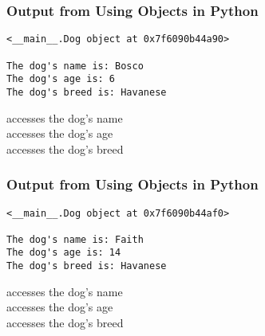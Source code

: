 \documentclass[14pt,aspectratio=169]{beamer}
\begin{document}
%
\begin{frame}[fragile]
  \frametitle{Output from Using Objects in Python}
  \begin{minipage}{6in}
    \vspace*{.15in}
    \begin{verbatim}
<__main__.Dog object at 0x7f6090b44a90>

The dog's name is: Bosco
The dog's age is: 6
The dog's breed is: Havanese
    \end{verbatim}
  \end{minipage}
  \vspace*{.05in}
  \begin{center}
    \normalsize {} accesses the dog's name \\
    \normalsize {} accesses the dog's age \\
    \normalsize {} accesses the dog's breed \\
  \end{center}
\end{frame}

%
\begin{frame}[fragile]
  \frametitle{Output from Using Objects in Python}
  \begin{minipage}{6in}
    \vspace*{.15in}
    \begin{verbatim}
<__main__.Dog object at 0x7f6090b44af0>

The dog's name is: Faith
The dog's age is: 14
The dog's breed is: Havanese
    \end{verbatim}
  \end{minipage}
  \vspace*{.05in}
  \begin{center}
    \normalsize {} accesses the dog's name \\
    \normalsize {} accesses the dog's age \\
    \normalsize {} accesses the dog's breed \\
  \end{center}
\end{frame}
\end{document}
